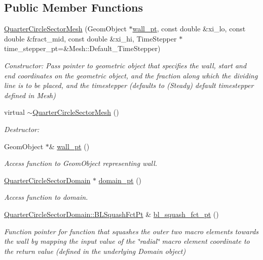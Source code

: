 \subsection*{Public Member Functions}
\begin{DoxyCompactItemize}
\item 
\hyperlink{classoomph_1_1QuarterCircleSectorMesh_a3fbcc7dd28aefc3dddda607785695afc}{Quarter\+Circle\+Sector\+Mesh} (Geom\+Object $\ast$\hyperlink{classoomph_1_1QuarterCircleSectorMesh_a0b03071bbe7e95cc6723c221ddc0998a}{wall\+\_\+pt}, const double \&xi\+\_\+lo, const double \&fract\+\_\+mid, const double \&xi\+\_\+hi, Time\+Stepper $\ast$time\+\_\+stepper\+\_\+pt=\&Mesh\+::\+Default\+\_\+\+Time\+Stepper)
\begin{DoxyCompactList}\small\item\em Constructor\+: Pass pointer to geometric object that specifies the wall, start and end coordinates on the geometric object, and the fraction along which the dividing line is to be placed, and the timestepper (defaults to (Steady) default timestepper defined in Mesh) \end{DoxyCompactList}\item 
virtual \hyperlink{classoomph_1_1QuarterCircleSectorMesh_af3aec899bd005cacb011c13bcb6e5f22}{$\sim$\+Quarter\+Circle\+Sector\+Mesh} ()
\begin{DoxyCompactList}\small\item\em Destructor\+: \end{DoxyCompactList}\item 
Geom\+Object $\ast$\& \hyperlink{classoomph_1_1QuarterCircleSectorMesh_a0b03071bbe7e95cc6723c221ddc0998a}{wall\+\_\+pt} ()
\begin{DoxyCompactList}\small\item\em Access function to Geom\+Object representing wall. \end{DoxyCompactList}\item 
\hyperlink{classoomph_1_1QuarterCircleSectorDomain}{Quarter\+Circle\+Sector\+Domain} $\ast$ \hyperlink{classoomph_1_1QuarterCircleSectorMesh_a53adafee1a15301fe99a481b641df45b}{domain\+\_\+pt} ()
\begin{DoxyCompactList}\small\item\em Access function to domain. \end{DoxyCompactList}\item 
\hyperlink{classoomph_1_1QuarterCircleSectorDomain_a6cffab57f87c9f4ab01744647240bb1e}{Quarter\+Circle\+Sector\+Domain\+::\+B\+L\+Squash\+Fct\+Pt} \& \hyperlink{classoomph_1_1QuarterCircleSectorMesh_a6f149022d7a40bd0efed49adacd716bf}{bl\+\_\+squash\+\_\+fct\+\_\+pt} ()
\begin{DoxyCompactList}\small\item\em Function pointer for function that squashes the outer two macro elements towards the wall by mapping the input value of the \char`\"{}radial\char`\"{} macro element coordinate to the return value (defined in the underlying Domain object) \end{DoxyCompactList}\end{DoxyCompactItemize}
